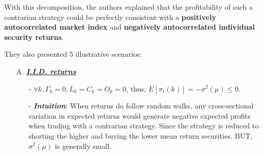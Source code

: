 With this decomposition, the authors explained that the profitability of such a contrarian strategy could be perfectly
consistent with a \textbf{positively autocorrelated market index} and \textbf{negatively autocorrelated individual security returns}.

They also presented 5 illustrative scenarios:
\begin{enumerate}
    \item[A.] \underline{\textbf{\textit{I.I.D. returns}}}
    \begin{enumerate}
        \item[-] $\forall k, \Gamma_k=0, L_k=C_k=O_k=0$, thus, $E[\pi_t(k)]=-\sigma^2(\mu)\leq 0$. 
        \item[-] \textit{\textbf{Intuition}}: When returns do follow random walks, any cross-sectional 
        variation in expected returns would generate negative expected profits when trading with a contrarian strategy. 
        Since the strategy is reduced to shorting the higher and buying the lower mean return securities. BUT, $\sigma^2(\mu)$ is generally small.
    \end{enumerate}


\end{enumerate}
